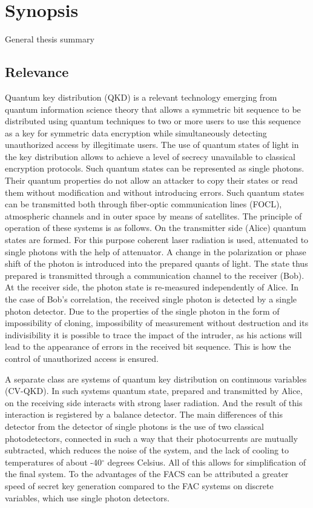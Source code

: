 \chapter*{Synopsis}

\begin{center}
    General thesis summary
\end{center}

\section*{Relevance}
Quantum key distribution (QKD) is a relevant technology emerging from quantum information science theory that allows a symmetric bit sequence to be distributed using quantum techniques to two or more users to use this sequence as a key for symmetric data encryption while simultaneously detecting unauthorized access by illegitimate users. The use of quantum states of light in the key distribution allows to achieve a level of secrecy unavailable to classical encryption protocols. Such quantum states can be represented as single photons. Their quantum properties do not allow an attacker to copy their states or read them without modification and without introducing errors. Such quantum states can be transmitted both through fiber-optic communication lines (FOCL), atmospheric channels and in outer space by means of satellites. The principle of operation of these systems is as follows. On the transmitter side (Alice) quantum states are formed. For this purpose coherent laser radiation is used, attenuated to single photons with the help of attenuator. A change in the polarization or phase shift of the photon is introduced into the prepared quants of light. The state thus prepared is transmitted through a communication channel to the receiver (Bob). At the receiver side, the photon state is re-measured independently of Alice. In the case of Bob's correlation, the received single photon is detected by a single photon detector. Due to the properties of the single photon in the form of impossibility of cloning, impossibility of measurement without destruction and its indivisibility it is possible to trace the impact of the intruder, as his actions will lead to the appearance of errors in the received bit sequence. This is how the control of unauthorized access is ensured. 

A separate class are systems of quantum key distribution on continuous variables (CV-QKD). In such systems quantum state, prepared and transmitted by Alice, on the receiving side interacts with strong laser radiation. And the result of this interaction is registered by a balance detector. The main differences of this detector from the detector of single photons is the use of two classical photodetectors, connected in such a way that their photocurrents are mutually subtracted, which reduces the noise of the system, and the lack of cooling to temperatures of about -40$^{\circ}$ degrees Celsius. All of this allows for simplification of the final system. To the advantages of the FACS can be attributed a greater speed of secret key generation compared to the FAC systems on discrete variables, which use single photon detectors. 


